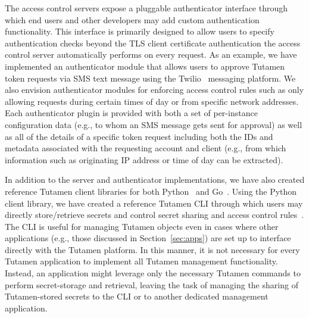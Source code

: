 The access control servers expose a pluggable authenticator interface
through which end users and other developers may add custom
authentication functionality. This interface is primarily designed to
allow users to specify authentication checks beyond the TLS client
certificate authentication the access control server automatically
performs on every request. As an example, we have implemented an
authenticator module that allows users to approve Tutamen token
requests via SMS text message using the Twilio~\cite{twilio} messaging
platform. We also envision authenticator modules for enforcing access
control rules such as only allowing requests during certain times of
day or from specific network addresses. Each authenticator plugin is
provided with both a set of per-instance configuration data (e.g., to
whom an SMS message gets sent for approval) as well as all of the
details of a specific token request including both the IDs and
metadata associated with the requesting account and client (e.g., from
which information such as originating IP address or time of day can be
extracted).

In addition to the server and authenticator implementations, we have
also created reference Tutamen client libraries for both
Python~\cite{src-tutamen-pytutamen} and
Go~\cite{src-tutamen-go}. Using the Python client library, we have
created a reference Tutamen CLI through which users may directly
store/retrieve secrets and control secret sharing and access control
rules~\cite{src-tutamen-tutamencli}. The CLI is useful for managing
Tutamen objects even in cases where other applications (e.g., those
discussed in Section~\ref{sec:apps}) are set up to interface directly
with the Tutamen platform. In this manner, it is not necessary for
every Tutamen application to implement all Tutamen management
functionality. Instead, an application might leverage only the
necessary Tutamen commands to perform secret-storage and retrieval,
leaving the task of managing the sharing of Tutamen-stored secrets to
the CLI or to another dedicated management application.

